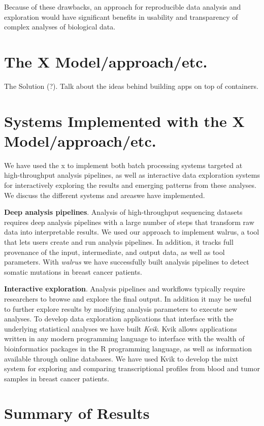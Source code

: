 Because of these drawbacks, an approach for reproducible data analysis and
exploration would have significant benefits in usability and transparency of
complex analyses of biological data.

\section{The X Model/approach/etc.} 
    The Solution (?). Talk about the ideas behind building apps on top of
    containers.  

\section{Systems Implemented with the X Model/approach/etc.} 
We have used the \gls{x} to implement both batch processing systems targeted at
high-throughput analysis pipelines, as well as interactive data
exploration systems for interactively exploring the results and emerging
patterns from these analyses.  We discuss the different systems and areaswe have
implemented. 

\textbf{Deep analysis pipelines}. 
Analysis of high-throughput sequencing datasets requires deep analysis pipelines
with a large number of steps that transform raw data into interpretable
results\cite{diao2015building}. We used our approach to implement walrus, a tool
that lets users create and run analysis pipelines. In addition, it tracks full
provenance of the input, intermediate, and output data, as well as tool
parameters. With \emph{walrus} we have successfully built analysis pipelines to
detect somatic mutations in breast cancer patients. 

\textbf{Interactive exploration}. Analysis pipelines and workflows typically
require researchers to browse and explore the final output. In addition it may
be useful to further explore results by modifying analysis parameters to execute
new analyses.  To develop data exploration applications that interface with the
underlying statistical analyses we have built \emph{Kvik}. Kvik allows
applications written in any modern programming language to interface with the
wealth of bioinformatics packages in the R programming language, as well as
information available through online databases. We have used Kvik to develop the
\gls{mixt} system for exploring and comparing transcriptional profiles from
blood and tumor samples in breast cancer patients. 


\section{Summary of Results} 



